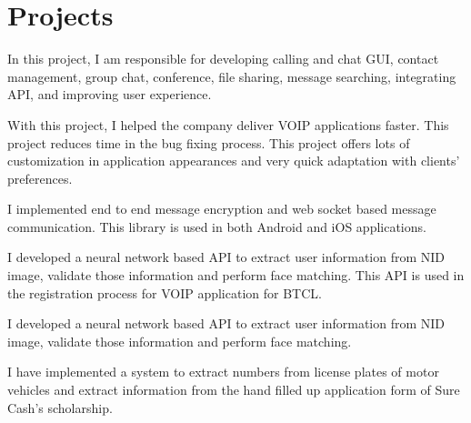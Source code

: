 \documentclass[]{deedy-resume-openfont}
\begin{document}
\begin{minipage}[t]{0.66\textwidth} 



\section{Projects}
In this project, I am responsible for developing  calling and chat GUI, contact management, group chat, conference, file sharing, message searching, integrating API, and improving user experience. 
\sectionsep

With this project, I helped the company deliver VOIP applications faster. This project reduces time in the bug fixing process.
This project offers lots of customization in application appearances and very quick adaptation with clients' preferences. 
\sectionsep

I implemented end to end message encryption and web socket based message communication. This library is used in both Android and iOS applications. 
\sectionsep

I developed a neural network based API to extract user information from NID image, validate those information and perform face matching. This API is used in the registration  process for VOIP application for BTCL.
\sectionsep

I developed a neural network based API to extract user information from NID image, validate those information and perform face matching. 
\sectionsep

 I have implemented a system to extract numbers from  license plates of motor vehicles  and extract information from  the hand filled up application form of Sure Cash’s scholarship. 
\sectionsep


\end{minipage}
\end{document}
